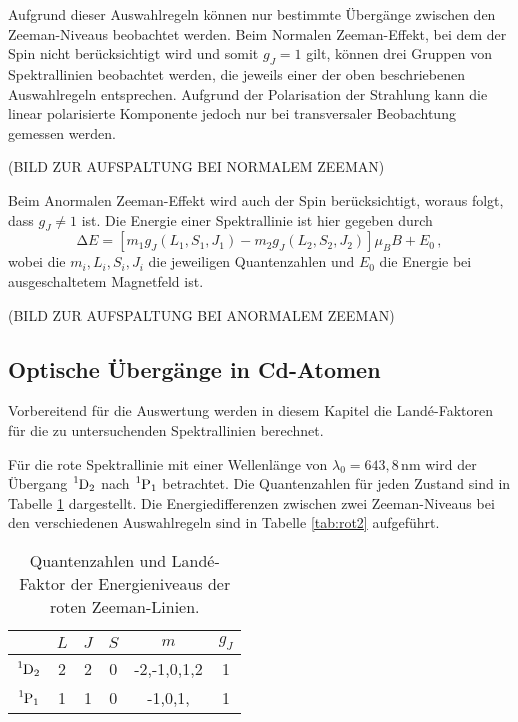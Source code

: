 Aufgrund dieser Auswahlregeln können nur bestimmte Übergänge zwischen den Zeeman-Niveaus
beobachtet werden. Beim Normalen Zeeman-Effekt, bei dem der Spin nicht berücksichtigt wird
und somit $g_J=1$ gilt,
können drei Gruppen von Spektrallinien beobachtet werden, die jeweils einer der oben
beschriebenen Auswahlregeln entsprechen. Aufgrund der Polarisation der Strahlung kann
die linear polarisierte Komponente jedoch nur bei transversaler Beobachtung gemessen werden.

(BILD ZUR AUFSPALTUNG BEI NORMALEM ZEEMAN)

Beim Anormalen Zeeman-Effekt wird auch der Spin berücksichtigt, woraus folgt, dass
$g_J\neq1$ ist. Die Energie einer Spektrallinie ist hier gegeben durch
\begin{equation}
  \increment E = [m_1 g_J(L_1,S_1,J_1) - m_2 g_J(L_2,S_2,J_2)] \mu_B B +E_0\,,
\end{equation}
wobei die $m_i, L_i, S_i, J_i$ die jeweiligen Quantenzahlen und $E_0$ die Energie bei
ausgeschaltetem Magnetfeld ist.

(BILD ZUR AUFSPALTUNG BEI ANORMALEM ZEEMAN)


\subsection{Optische Übergänge in Cd-Atomen}

Vorbereitend für die Auswertung werden in diesem Kapitel die Landé-Faktoren für die
zu untersuchenden Spektrallinien berechnet.

Für die rote Spektrallinie mit einer Wellenlänge von $\lambda_0=643{,}8\,$nm wird
der Übergang $\ce{^{1}D_2}$ nach $\ce{^{1}P_1}$ betrachtet. Die Quantenzahlen für
jeden Zustand sind in Tabelle \ref{tab:rot1} dargestellt. Die Energiedifferenzen zwischen
zwei Zeeman-Niveaus bei den verschiedenen Auswahlregeln sind in Tabelle \ref{tab:rot2}
aufgeführt.

\begin{table}
  \centering
  \caption{Quantenzahlen und Landé-Faktor der Energieniveaus der roten Zeeman-Linien.}
  \begin{tabular}{c c c c c c}
    \toprule
    & $L$ & $J$ & $S$ & $m$ & $g_J$ \\
    \midrule
    $\ce{^{1}D_2}$ & 2 & 2 & 0 & -2,-1,0,1,2 & 1 \\
    $\ce{^{1}P_1}$ & 1 & 1 & 0 & -1,0,1, & 1 \\
    \bottomrule
\end{tabular}
  \label{tab:rot1}
\end{table}

